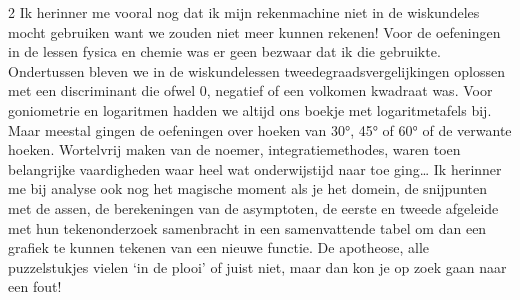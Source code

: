\begin{multicols}{2}
Ik herinner me vooral nog dat ik mijn rekenmachine niet in de wiskundeles mocht gebruiken want we zouden niet meer kunnen rekenen! Voor de oefeningen in de lessen fysica en chemie was er geen bezwaar dat ik die gebruikte. Ondertussen bleven we in de wiskundelessen tweedegraadsvergelijkingen oplossen met een discriminant die ofwel 0, negatief of een volkomen kwadraat was. Voor goniometrie en logaritmen hadden we altijd ons boekje met logaritmetafels bij. Maar meestal gingen de oefeningen over hoeken van 30°, 45° of 60° of de verwante hoeken. Wortelvrij maken van de noemer, integratiemethodes,  waren toen belangrijke vaardigheden waar heel wat onderwijstijd naar toe ging… Ik herinner me bij analyse ook nog het magische moment als je het domein, de snijpunten met de assen, de berekeningen van de asymptoten, de eerste en tweede afgeleide met hun tekenonderzoek samenbracht in een samenvattende tabel om dan een grafiek te kunnen tekenen van een nieuwe functie. De apotheose, alle puzzelstukjes vielen `in de plooi' of juist niet, maar dan kon je op zoek gaan naar een fout!


\end{multicols}
